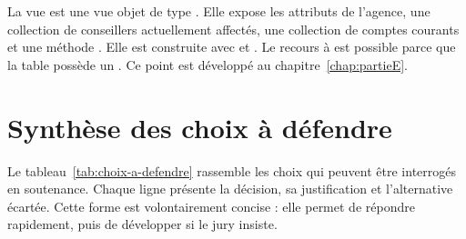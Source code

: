La vue  est une vue objet de type .
Elle expose les attributs de l'agence, une collection de conseillers
actuellement affectés, une collection de comptes courants et une méthode
. Elle est construite avec  et
. Le recours à  est possible
parce que la table  possède un
. Ce point est développé au
chapitre~\ref{chap:partieE}.

\section{Synthèse des choix à défendre}

Le tableau~\ref{tab:choix-a-defendre} rassemble les choix qui peuvent être
interrogés en soutenance. Chaque ligne présente la décision, sa justification
et l'alternative écartée. Cette forme est volontairement concise : elle permet
de répondre rapidement, puis de développer si le jury insiste.

